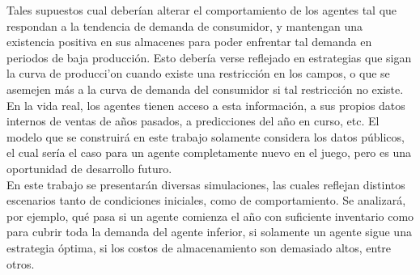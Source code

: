Tales supuestos cual deber\'ian alterar el comportamiento de los agentes tal que respondan a la tendencia de demanda de consumidor, y mantengan una existencia positiva en sus almacenes para poder enfrentar tal demanda en periodos de baja producci\'on. Esto deber\'ia verse reflejado en estrategias que sigan la curva de producci'on cuando existe una restricci\'on en los campos, o que se asemejen m\'as  a la curva de demanda del consumidor si tal restricci\'on no existe.\\

En la vida real, los agentes tienen acceso a esta informaci\'on, a sus propios datos internos de ventas de a\~nos pasados, a predicciones del a\~no en curso, etc. El modelo que se construir\'a en este trabajo solamente considera los datos p\'ublicos, el cual ser\'ia el caso para un agente completamente nuevo en el juego, pero es una oportunidad de desarrollo futuro.\\

En este trabajo se presentar\'an diversas simulaciones, las cuales reflejan distintos escenarios tanto de condiciones iniciales, como de comportamiento. Se analizar\'a, por ejemplo, qu\'e pasa si un agente comienza el a\~no con suficiente inventario como para cubrir toda la demanda del agente inferior, si solamente un agente sigue una estrategia \'optima, si los costos de almacenamiento son demasiado altos, entre otros.


